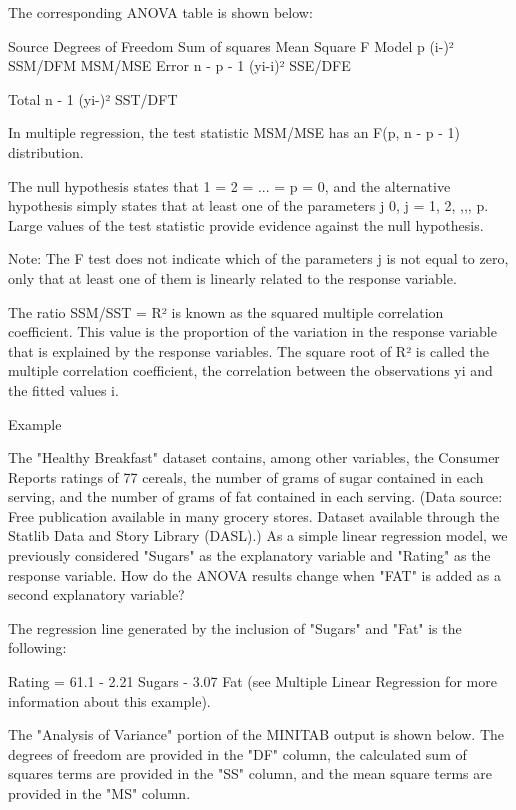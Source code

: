 The corresponding ANOVA table is shown below:

Source	Degrees of Freedom	Sum of squares		Mean Square	F       
Model		p		(i-)²		      SSM/DFM	MSM/MSE 
Error		n - p - 1	(yi-i)²			SSE/DFE		
																						
Total		n - 1		(yi-)²			SST/DFT	

 
In multiple regression, the test statistic MSM/MSE has an F(p, n - p - 1) 
distribution.


The null hypothesis states that 1 = 
2 = ... = p = 0,
and the alternative hypothesis simply states that at least one of the parameters
j 0, j = 1, 2, ,,, p.
Large values of the test statistic provide evidence against the null hypothesis.


Note: The F test does not indicate which of the parameters j
 is not equal to zero, only that at least one of them is linearly related to the response variable.


The ratio SSM/SST = R² is known as the squared multiple correlation
coefficient.  This value is the proportion of the variation in the response variable
that is explained by the response variables.  The square root of R² is called
the multiple correlation coefficient, the correlation between the observations
yi and the fitted values i.


Example


The "Healthy Breakfast" dataset contains, among other variables, 
the Consumer Reports ratings of 77 cereals, the number of grams 
of sugar contained in each serving, and the number of grams of fat contained
in each serving. (Data source: Free publication 
available in many grocery stores. Dataset available through the 
Statlib Data and Story 
Library (DASL).) 
As a simple linear regression model, we previously considered "Sugars" as the explanatory 
variable and "Rating" as the response variable.  How do the ANOVA results change when "FAT"
is added as a second explanatory variable? 


The regression line generated by the inclusion of "Sugars" and "Fat" is the following: 

Rating = 61.1 - 2.21 Sugars - 3.07 Fat (see Multiple
Linear Regression for more information about this example).  

The "Analysis of Variance" portion of the MINITAB output is shown below.
The degrees of freedom are provided in the "DF" column, the calculated
sum of squares terms are provided in the "SS" column, and the mean
square terms are provided in the "MS" column.    

